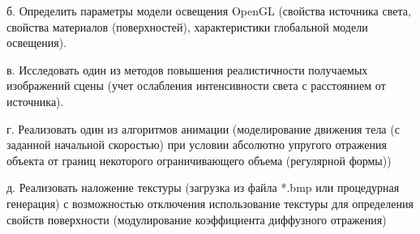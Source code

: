 \documentclass[a4paper, 14pt]{extarticle}
\begin{document}
б. Определить параметры модели освещения OpenGL (свойства источника света, свойства
материалов (поверхностей), характеристики глобальной модели освещения).

в. Исследовать один из методов повышения реалистичности получаемых изображений сцены
(учет ослабления интенсивности света с расстоянием от источника).

г. Реализовать один из алгоритмов анимации (моделирование движения тела (с заданной начальной скоростью) при условии абсолютно упругого отражения объекта от границ некоторого ограничивающего объема (регулярной формы))

д. Реализовать наложение текстуры (загрузка из файла *.bmp или процедурная генерация) с возможностью отключения использование текстуры для определения свойств поверхности (модулирование коэффициента диффузного отражения)
\pagebreak
\end{document}
